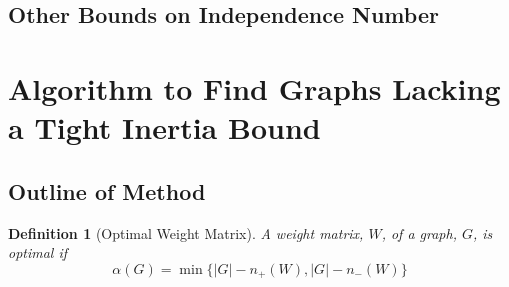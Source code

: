 \documentclass[12pt]{article}
\theoremstyle{parenbold}
\newtheorem{definition}{Definition}[section]
\begin{document}
\subsection{Other Bounds on Independence Number}

\section{Algorithm to Find Graphs Lacking a Tight Inertia Bound}

\subsection{Outline of Method}

\begin{definition}[Optimal Weight Matrix]
A weight matrix, $W$, of a graph, $G$, is optimal if
\begin{equation}
\alpha(G) = \min\{|G| - n_+(W),|G| - n_-(W)\}
\end{equation}
\end{definition}
\end{document}
